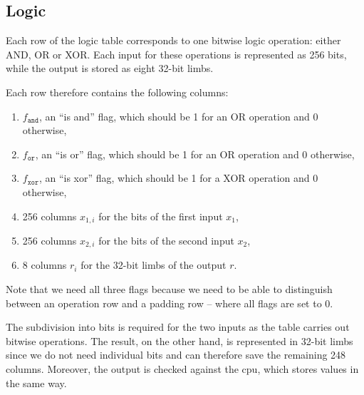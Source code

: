 \subsection{Logic}
\label{logic}

Each row of the logic table corresponds to one bitwise logic operation: either AND, OR or XOR. Each input for these operations is represented as 256 bits, while the output is stored as eight 32-bit limbs. 

Each row therefore contains the following columns:
\begin{enumerate}
    \item $f_{\texttt{and}}$, an ``is and'' flag, which should be 1 for an OR operation and 0 otherwise,
    \item $f_{\texttt{or}}$, an ``is or'' flag, which should be 1 for an OR operation and 0 otherwise,
    \item $f_{\texttt{xor}}$, an ``is xor'' flag, which should be 1 for a XOR operation and 0 otherwise,
    \item 256 columns $x_{1, i}$ for the bits of the first input $x_1$,
    \item 256 columns $x_{2, i}$ for the bits of the second input $x_2$,
    \item 8 columns $r_i$ for the 32-bit limbs of the output $r$.
\end{enumerate}

Note that we need all three flags because we need to be able to distinguish between an operation row and a padding row -- where all flags are set to 0.

The subdivision into bits is required for the two inputs as the table carries out bitwise operations. The result, on the other hand, is represented in 32-bit limbs since we do not need individual bits and can therefore save the remaining 248 columns. Moreover, the output is checked against the cpu, which stores values in the same way. 

